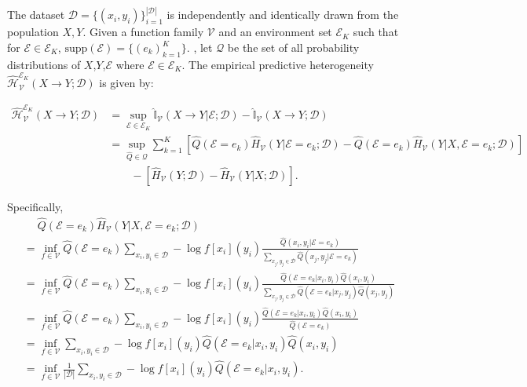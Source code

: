 The dataset $\mathcal D = \{(x_i,y_i)\}_{i=1}^{|\mathcal D|}$ is independently and identically drawn from the population $X,Y$. 
Given a function family $\mathcal V $ and an environment set $\mathscr E_K$ such that for $\mathcal E\in \mathscr E_K$, $\text{supp}(\mathcal E) = \{ (e_k)_{k=1}^K \}$. , let $\mathcal Q$ be the set of all probability distributions of $X$,$Y$,$\mathcal E$ where $\mathcal E \in \mathscr E_K$.  The empirical predictive heterogeneity $\hat{\mathcal H}_{\mathcal V}^{\mathscr E_K}(X \rightarrow Y; \mathcal D)$ is given by:
\begin{small}
\begin{align}
    \hat{\mathcal H}_{\mathcal V}^{\mathscr E_K}(X \rightarrow Y; \mathcal D) 
    &= \sup_{\mathcal E \in \mathscr E_K }\hat{\mathbb{I}}_{\mathcal{V}}(X\rightarrow Y|\mathcal{E};\mathcal D)-\hat {\mathbb{I}}_{\mathcal{V}}(X\rightarrow Y;\mathcal D) \\
    &= \sup_{\hat Q \in \mathcal Q } {\sum_{k=1}^K \left[\hat Q(\mathcal E=e_k)\hat H_{\mathcal V}(Y|\mathcal E=e_k;\mathcal D) - \hat Q(\mathcal E=e_k)\hat H_{\mathcal V}(Y|X, \mathcal E=e_k;\mathcal D)\right]} \\
    & \quad\quad - [\hat H_{\mathcal V}(Y;\mathcal D) - \hat H_{\mathcal V}(Y|X;\mathcal D)].
\end{align}
\end{small}
Specifically, 
\begin{align}
    & \quad\; \hat Q(\mathcal E=e_k)\hat H_{\mathcal V}(Y|X, \mathcal E=e_k;\mathcal D) \\
    &= \inf_{f \in \mathcal V} \hat Q(\mathcal E=e_k) \sum_{x_i,y_i \in \mathcal D} -\log  f[x_i](y_i) \frac{\hat Q(x_i,y_i|\mathcal E=e_k)}{\sum_{x_j,y_j \in \mathcal D}\hat Q(x_j,y_j|\mathcal E=e_k) }  \\
    &= \inf_{f \in \mathcal V} \hat Q(\mathcal E=e_k) \sum_{x_i,y_i \in \mathcal D} -\log f[x_i](y_i) \frac{\hat Q(\mathcal E=e_k|x_i,y_i)
    \hat Q(x_i,y_i)}{\sum_{x_j,y_j \in \mathcal D}\hat Q(\mathcal E=e_k|x_j,y_j)\hat Q(x_j,y_j) } \\
    &= \inf_{f \in \mathcal V} \hat Q(\mathcal E=e_k) \sum_{x_i,y_i \in \mathcal D} -\log f[x_i](y_i) \frac{\hat Q(\mathcal E=e_k|x_i,y_i)
    \hat Q(x_i,y_i)}{\hat Q(\mathcal E=e_k) } \\
    &= \inf_{f \in \mathcal V} \sum_{x_i,y_i \in \mathcal D} -\log f[x_i](y_i) \hat Q(\mathcal E=e_k|x_i,y_i) \hat Q(x_i,y_i) \\
    &= \inf_{f \in \mathcal V} \frac{1}{|\mathcal D|}  \sum_{x_i,y_i \in \mathcal D} -\log f[x_i](y_i) \hat Q(\mathcal E=e_k|x_i,y_i).
\end{align}

